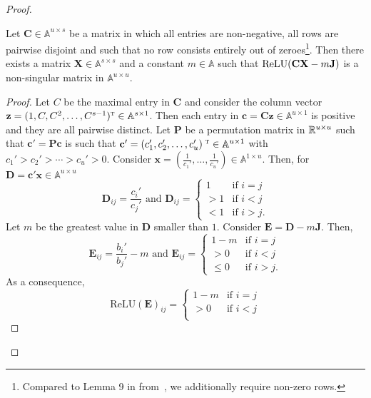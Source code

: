 \begin{proof}
{\begin{lemma}\label{lem:ReLUlemma9}
  Let  $\mathbf{C}\in \mathbb{A}^{u\times s}$ be a matrix in which 
  all entries are non-negative, all rows are pairwise disjoint and such that no row consists entirely
  out of zeroes\footnote{Compared to Lemma 9 in from~\cite{grohewl},
 we additionally require non-zero rows.}.
  Then there exists a matrix $\mathbf{X}\in\mathbb{A}^{s\times s}$ and a constant $m\in\mathbb{A}$
  such that $\text{\normalfont ReLU}(\mathbf{CX}-m\mathbf{J})$ is a
  non-singular matrix in $\mathbb{A}^{u\times u}$.
\end{lemma}
\begin{proof}
Let $C$ be the maximal entry in $\mathbf{C}$ and consider the column vector $\mathbf{z}=(1,C,C^2,\ldots,C^{s-1})^{\textsc{t}}\in\mathbb{A}^{s\times 1}$.
Then each entry in $\mathbf{c}=\mathbf{C}\mathbf{z}\in\mathbb{A}^{u\times 1}$ is positive and they are all pairwise distinct. 
Let $\mathbf{P}$ be a permutation matrix in $\Rb^{u\times u}$ such that $\mathbf{c}'=\mathbf{P}\mathbf{c}$ is such that  $\mathbf{c}'=(c_1',c_2',\ldots,c_u')^{\textsc{	t}}\in\mathbb{A}^{u\times 1}$ with $c_1'> c_2'>\cdots > c_u'>0$. 
Consider $\mathbf{x}=\left(\frac{1}{c_1'},\ldots,\frac{1}{c_u'}\right)\in \mathbb{A}^{1\times u}$. Then, for $\mathbf{D}=\mathbf{c}'\mathbf{x}\in\mathbb{A}^{u\times u}$
$$
\mathbf{D}_{ij}=\frac{c_i'}{c_j'}  \text{ and } \mathbf{D}_{ij}=\begin{cases}  1 & \text{if $i=j$}\\
>1 & \text{if $i<j$}\\
< 1 & \text{if $i>j$}.
\end{cases}
$$
Let $m$ be the greatest value  in $\mathbf{D}$ smaller than $1$.
Consider $\mathbf{E}=\mathbf{D}- m\mathbf{J}$.
Then,
$$
\mathbf{E}_{ij}=\frac{b_i'}{b_j'}- m \text{ and } \mathbf{E}_{ij}=\begin{cases}  1-m & \text{if $i=j$} \\
> 0 & \text{if $i<j$}\\
\leq 0  & \text{if $i>j$}.
\end{cases}
$$
As a consequence,
$$
\text{ReLU}(\mathbf{E})_{ij}=\begin{cases}  1-m & \text{if $i=j$}\\
>0 & \text{if $i<j$}\\

\end{cases}$$
\end{proof}}
\end{proof}
